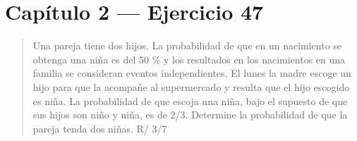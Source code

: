 \documentclass[11pt]{article}
\begin{document}
\section*{Cap\'itulo 2 --- Ejercicio 47}

\begin{quote}
Una pareja tiene dos hijos. La probabilidad de que en un nacimiento se obtenga una ni\~na es del 50 \% y los resultados en los nacimientos en una familia se consideran eventos independientes. El lunes la madre escoge un hijo para que la acompa\~ne al supermercado y resulta que el hijo escogido es ni\~na. La probabilidad de que escoja una ni\~na, bajo el supuesto de que sus hijos son ni\~no y ni\~na, es de 2/3. Determine la probabilidad de que la pareja tenda dos ni\~nas. \hfill R/ 3/7
\end{quote}
\end{document}
